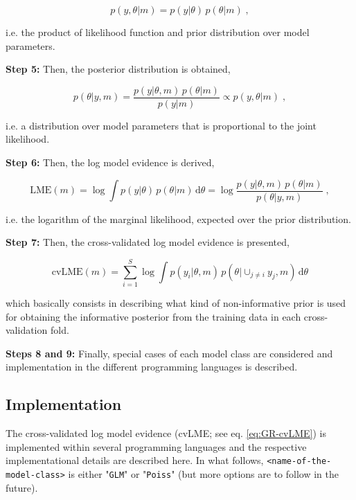 \begin{equation} \label{GR-JL}
p(y,\theta|m) = p(y|\theta) \, p(\theta|m) \; ,
\end{equation}

i.e. the product of likelihood function and prior distribution over model parameters.

\textbf{Step 5:} Then, the posterior distribution is obtained,

\begin{equation} \label{GR-post}
p(\theta|y,m) = \frac{p(y|\theta,m) \, p(\theta|m)}{p(y|m)} \propto p(y,\theta|m) \; ,
\end{equation}

i.e. a distribution over model parameters that is proportional to the joint likelihood.

\textbf{Step 6:} Then, the log model evidence is derived,

\begin{equation} \label{GR-LME}
\mathrm{LME}(m) = \log \int p(y|\theta) \, p(\theta|m) \, \mathrm{d}\theta  = \log \frac{p(y|\theta,m) \, p(\theta|m)}{p(\theta|y,m)} \; ,
\end{equation}

i.e. the logarithm of the marginal likelihood, expected over the prior distribution.

\textbf{Step 7:} Then, the cross-validated log model evidence is presented,

\begin{equation} \label{eq:GR-cvLME}
\mathrm{cvLME}(m) = \sum_{i=1}^S \log \int p(y_i|\theta,m) \, p(\theta|\cup_{j \neq i} y_j, m) \, \mathrm{d}\theta
\end{equation}

which basically consists in describing what kind of non-informative prior is used for obtaining the informative posterior from the training data in each cross-validation fold.

\textbf{Steps 8 and 9:} Finally, special cases of each model class are considered and implementation in the different programming languages is described.


\subsection{Implementation} \label{sec:Gen-Rem-Imp}

The cross-validated log model evidence (cvLME; see eq. \ref{eq:GR-cvLME}) is implemented within several programming languages and the respective implementational details are described here. In what follows, \verb|<name-of-the-model-class>| is either "\verb|GLM|" or "\verb|Poiss|" (but more options are to follow in the future).

